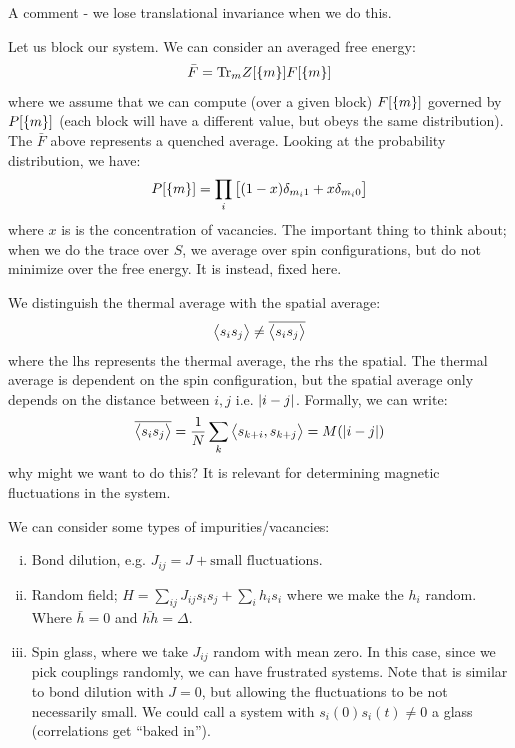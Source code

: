 A comment - we lose translational invariance when we do this.

Let us block our system. We can consider an averaged free energy:
\begin{equation}
    \bar{F} = \mathrm{Tr}_m Z[\set{m}]F[\set{m}]
\end{equation}
where we assume that we can compute (over a given block) $F[\set{m}]$ governed by $P[\set{m}]$ (each block will have a different value, but obeys the same distribution). The $\bar{F}$ above represents a quenched average. Looking at the probability distribution, we have:
\begin{equation}
    P[\set{m}] = \prod_i \left[(1 - x)\delta_{m_i 1} + x \delta_{m_i0}\right]
\end{equation}
where $x$ is is the concentration of vacancies. The important thing to think about; when we do the trace over $S$, we average over spin configurations, but do not minimize over the free energy. It is instead, fixed here.

We distinguish the thermal average with the spatial average:
\begin{equation}
    \left< s_is_j \right> \neq \overline{\left< s_is_j \right>}
\end{equation}
where the lhs represents the thermal average, the rhs the spatial. The thermal average is dependent on the spin configuration, but the spatial average only depends on the distance between $i, j$ i.e. $\lvert i - j \rvert$. Formally, we can write:
\begin{equation}
    \overline{\left< s_is_j \right>} = \frac{1}{N}\sum_k \left< s_{k+i}, s_{k+j} \right> = M(\lvert i-j \rvert)
\end{equation}
why might we want to do this? It is relevant for determining magnetic fluctuations in the system.

We can consider some types of impurities/vacancies:
\begin{enumerate}[(i)]
    \item Bond dilution, e.g. $J_{ij} = J + \text{small fluctuations}$.
    \item Random field; $H = \sum_{ij}J_{ij}s_is_j + \sum_i h_i s_i$ where we make the $h_i$ random. Where $\bar{h} = 0$ and $\overline{hh} = \Delta$.
    \item Spin glass, where we take $J_{ij}$ random with mean zero. In this case, since we pick couplings randomly, we can have frustrated systems. Note that is similar to bond dilution with $J = 0$, but allowing the fluctuations to be not necessarily small. We could call a system with $s_i(0)s_i(t) \neq 0$ a glass (correlations get ``baked in'').
\end{enumerate}

